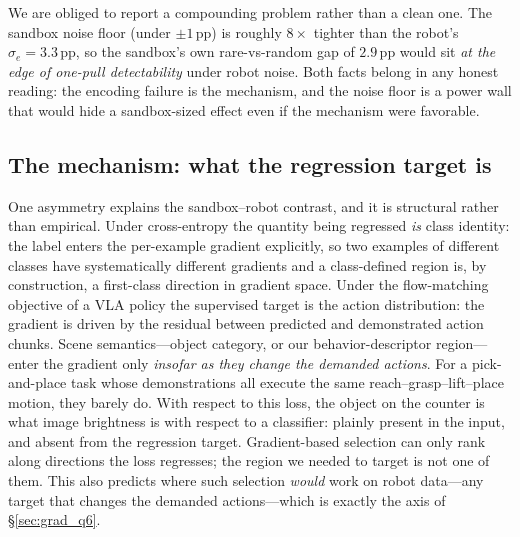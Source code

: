 We are obliged to report a compounding problem rather than a clean one. The
sandbox noise floor (under $\pm1$\,pp) is roughly $8\times$ tighter than the
robot's $\sigma_e{=}3.3$\,pp, so the sandbox's own rare-vs-random gap of
$2.9$\,pp would sit \emph{at the edge of one-pull detectability} under robot
noise. Both facts belong in any honest reading: the encoding failure is the
mechanism, and the noise floor is a power wall that would hide a
sandbox-sized effect even if the mechanism were favorable.

\subsection{The mechanism: what the regression target is}
\label{sec:grad_mech}
One asymmetry explains the sandbox--robot contrast, and it is structural rather
than empirical. Under cross-entropy the quantity being regressed \emph{is} class
identity: the label enters the per-example gradient explicitly, so two examples
of different classes have systematically different gradients and a class-defined
region is, by construction, a first-class direction in gradient space. Under the
flow-matching objective of a VLA policy the supervised target is the action
distribution: the gradient is driven by the residual between predicted and
demonstrated action chunks. Scene semantics---object category, or our
behavior-descriptor region---enter the gradient only \emph{insofar as they change
the demanded actions}. For a pick-and-place task whose demonstrations all execute
the same reach--grasp--lift--place motion, they barely do. With respect to this
loss, the object on the counter is what image brightness is with respect to a
classifier: plainly present in the input, and absent from the regression target.
Gradient-based selection can only rank along directions the loss regresses; the
region we needed to target is not one of them. This also predicts where such
selection \emph{would} work on robot data---any target that changes the demanded
actions---which is exactly the axis of \S\ref{sec:grad_q6}.

